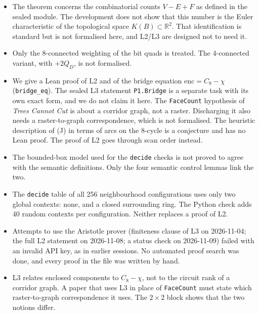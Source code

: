 \documentclass[11pt]{article}
\theoremstyle{definition}
\theoremstyle{remark}
\begin{document}
\begin{itemize}
\item The theorem concerns the combinatorial counts $V-E+F$ as defined in the
  sealed module. The development does not show that this number is the Euler
  characteristic of the topological space $K(B)\subset\mathbb{R}^2$. That
  identification is standard but is not formalised here, and L2/L3 are
  designed not to need it.
\item Only the 8-connected weighting of the bit quads is treated. The
  4-connected variant, with $+2Q_D$, is not formalised.
\item We give a Lean proof of L2 and of the bridge equation
  $\mathrm{enc}=C_8-\chi$ (\texttt{bridge\_eq}). The sealed L3 statement
  \texttt{P1.Bridge} is a separate task with its own exact form, and we do not claim it here.
  The \texttt{FaceCount} hypothesis of \emph{Trees Cannot Cut} is about a corridor graph,
  not a raster. Discharging it also needs a raster-to-graph correspondence, which
  is not formalised. The
  heuristic description of (J) in terms of arcs on the 8-cycle is a conjecture and
  has no Lean proof. The proof of L2 goes through scan order instead.
\item The bounded-box model used for the \texttt{decide} checks is not proved
  to agree with the semantic definitions. Only the four semantic control lemmas
  link the two.
\item The \texttt{decide} table of all 256 neighbourhood configurations
  uses only two global contexts: none, and a closed surrounding ring. The Python
  check adds 40 random contexts per configuration. Neither replaces a proof of
  L2.
\item Attempts to use the Aristotle prover (finiteness clause of L3 on
  2026-11-04; the full L2 statement on 2026-11-08; a status check on 2026-11-09)
  failed with an invalid API key, as in earlier sessions. No automated proof search
  was done, and every proof in the file was written by hand.
\item L3 relates enclosed components to $C_8-\chi$, not to the circuit rank of
  a corridor graph. A paper that uses L3 in place of \texttt{FaceCount} must
  state which raster-to-graph correspondence it uses. The $2\times2$ block
  shows that the two notions differ.
\end{itemize}
\end{document}
